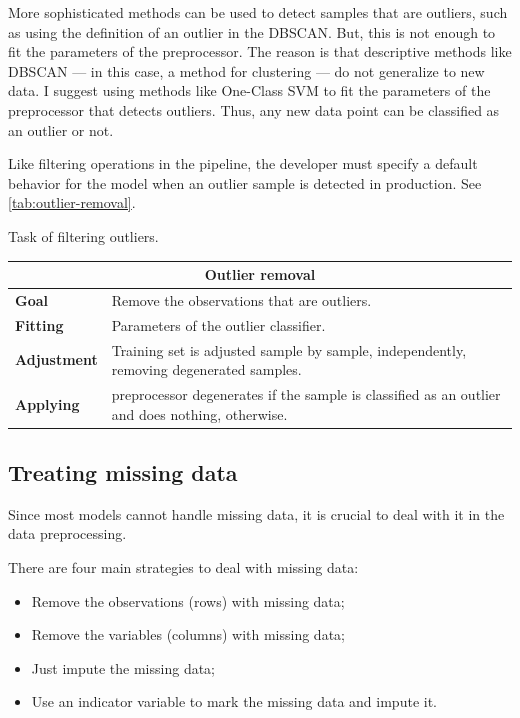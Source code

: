 More sophisticated methods can be used to detect samples that are outliers, such as using
the definition of an outlier in the DBSCAN. But, this is not
enough to fit the parameters of the \gls{preprocessor}.  The reason is that descriptive methods
like DBSCAN  --- in this case, a method for clustering --- do not generalize to new data.
I suggest using methods like One-Class SVM to fit the
parameters of the \gls{preprocessor} that detects outliers.  Thus, any new data point can
be classified as an outlier or not.

Like filtering operations in the pipeline, the developer must specify a default behavior
for the model when an outlier sample is detected in production.  See
\cref{tab:outlier-removal}.

\begin{tablebox}[label=tab:outlier-removal]{Task of filtering outliers.}
  \centering
  \begin{tabular}{lp{6cm}}
    \toprule
    \multicolumn{2}{c}{\textbf{Outlier removal}} \\
    \midrule
    \textbf{Goal} &
      Remove the observations that are outliers. \\
    \textbf{Fitting} &
      Parameters of the outlier \gls{classifier}. \\
    \textbf{Adjustment} &
      Training set is adjusted sample by sample, independently, removing
      degenerated samples. \\
    \textbf{Applying} &
      \Gls{preprocessor} degenerates if the sample is classified as an outlier and does
      nothing, otherwise. \\
    \bottomrule
  \end{tabular}
\end{tablebox}

\subsection{Treating missing data}

Since most models cannot handle missing data, it is crucial to deal with it in the data
preprocessing.

There are four main strategies to deal with missing data:
\begin{itemize}
  \itemsep0em
  \item Remove the observations (rows) with missing data;
  \item Remove the variables (columns) with missing data;
  \item Just impute the missing data;
  \item Use an indicator variable to mark the missing data and impute it.
\end{itemize}

